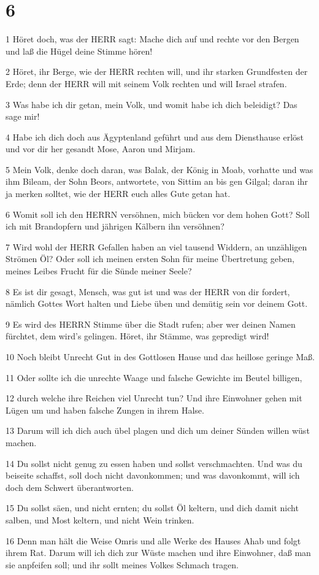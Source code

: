 \chapter{6}

\par 1 Höret doch, was der HERR sagt: Mache dich auf und rechte vor den Bergen und laß die Hügel deine Stimme hören!
\par 2 Höret, ihr Berge, wie der HERR rechten will, und ihr starken Grundfesten der Erde; denn der HERR will mit seinem Volk rechten und will Israel strafen.
\par 3 Was habe ich dir getan, mein Volk, und womit habe ich dich beleidigt? Das sage mir!
\par 4 Habe ich dich doch aus Ägyptenland geführt und aus dem Diensthause erlöst und vor dir her gesandt Mose, Aaron und Mirjam.
\par 5 Mein Volk, denke doch daran, was Balak, der König in Moab, vorhatte und was ihm Bileam, der Sohn Beors, antwortete, von Sittim an bis gen Gilgal; daran ihr ja merken solltet, wie der HERR euch alles Gute getan hat.
\par 6 Womit soll ich den HERRN versöhnen, mich bücken vor dem hohen Gott? Soll ich mit Brandopfern und jährigen Kälbern ihn versöhnen?
\par 7 Wird wohl der HERR Gefallen haben an viel tausend Widdern, an unzähligen Strömen Öl? Oder soll ich meinen ersten Sohn für meine Übertretung geben, meines Leibes Frucht für die Sünde meiner Seele?
\par 8 Es ist dir gesagt, Mensch, was gut ist und was der HERR von dir fordert, nämlich Gottes Wort halten und Liebe üben und demütig sein vor deinem Gott.
\par 9 Es wird des HERRN Stimme über die Stadt rufen; aber wer deinen Namen fürchtet, dem wird's gelingen. Höret, ihr Stämme, was gepredigt wird!
\par 10 Noch bleibt Unrecht Gut in des Gottlosen Hause und das heillose geringe Maß.
\par 11 Oder sollte ich die unrechte Waage und falsche Gewichte im Beutel billigen,
\par 12 durch welche ihre Reichen viel Unrecht tun? Und ihre Einwohner gehen mit Lügen um und haben falsche Zungen in ihrem Halse.
\par 13 Darum will ich dich auch übel plagen und dich um deiner Sünden willen wüst machen.
\par 14 Du sollst nicht genug zu essen haben und sollst verschmachten. Und was du beiseite schaffst, soll doch nicht davonkommen; und was davonkommt, will ich doch dem Schwert überantworten.
\par 15 Du sollst säen, und nicht ernten; du sollst Öl keltern, und dich damit nicht salben, und Most keltern, und nicht Wein trinken.
\par 16 Denn man hält die Weise Omris und alle Werke des Hauses Ahab und folgt ihrem Rat. Darum will ich dich zur Wüste machen und ihre Einwohner, daß man sie anpfeifen soll; und ihr sollt meines Volkes Schmach tragen.

